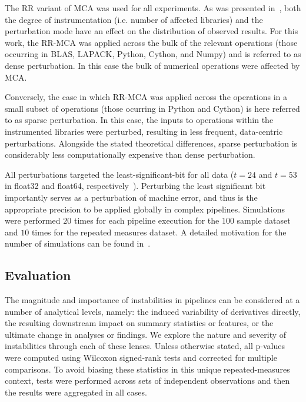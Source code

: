 \documentclass[fleqn,10pt]{SelfArx} %
\newcommand{\new}[1]{{#1}}
\newcommand{\newtwo}[1]{{#1}}
\begin{document}
The RR variant of MCA was used for all experiments. As was presented in~\cite{Kiar2020-lb}, both the degree of
instrumentation (i.e. number of affected libraries) and the perturbation mode have an effect on the distribution of
observed results. For this work, the RR-MCA was applied across the bulk of the relevant operations (those occurring
in BLAS, LAPACK, Python, Cython, and Numpy) and is referred to as dense perturbation. In this case the bulk of
numerical operations were affected by MCA.

Conversely, the case in which RR-MCA was applied across the operations in a small subset of operations (those ocurring
in Python and Cython) is here referred to as sparse perturbation. In this case, the inputs to operations within the
instrumented libraries were perturbed, resulting in less frequent, data-centric perturbations. Alongside the stated theoretical
differences, sparse perturbation is considerably less computationally expensive than dense perturbation.

All perturbations targeted the least-significant-bit for all data ($t=24$ and $t=53$ in float32 and float64,
respectively~\cite{Denis2016-wo}). Perturbing the least significant bit importantly serves as a perturbation of
machine error, and thus is the appropriate precision to be applied globally in complex pipelines. Simulations were
performed $20$ times for each pipeline execution for the $100$ sample dataset and $10$ times for the repeated
measures dataset. A detailed motivation for the number of simulations can be found in~\cite{Sohier2018-ts}.

\subsection*{Evaluation}

The magnitude and importance of instabilities in pipelines can be considered at a number of analytical levels, namely:
the induced variability of derivatives directly, the resulting downstream impact on summary statistics or features, or
the ultimate change in analyses or findings. We explore the nature and severity of instabilities through each of these
lenses. Unless otherwise stated, all p-values were computed using Wilcoxon signed-rank tests \newtwo{and corrected for multiple comparisons}. \new{To avoid biasing
these statistics in this unique repeated-measures context, tests were performed across sets of independent
observations and then the results were aggregated in all cases.}
\end{document}
